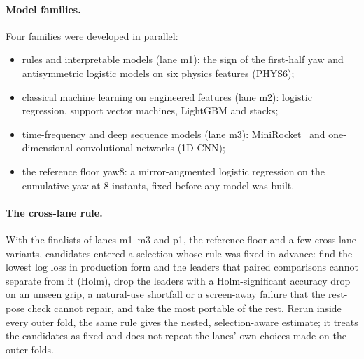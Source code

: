 \paragraph{Model families.} Four families were developed in parallel:
\begin{itemize}[nosep,leftmargin=1.5em]
  \item rules and interpretable models (lane m1): the sign of the first-half yaw and antisymmetric logistic models on
    six physics features (PHYS6);
  \item classical machine learning on  engineered features (lane m2): logistic regression,
    support vector machines, LightGBM and stacks;
  \item time-frequency and deep sequence models (lane m3): MiniRocket~\cite{dempster2021minirocket} and
    one-dimensional convolutional networks (1D CNN);
  \item the reference floor yaw8: a mirror-augmented logistic regression on the cumulative yaw at 8 instants, fixed
    before any model was built.
\end{itemize}

\paragraph{The cross-lane rule.} With the finalists of lanes m1--m3 and p1, the reference floor and a few cross-lane
variants,  candidates entered a selection whose rule was fixed in advance: find the lowest log
loss in production form and the leaders that paired comparisons cannot separate from it (Holm), drop the leaders
with a Holm-significant accuracy drop on an unseen grip, a natural-use shortfall or a screen-away failure that the
rest-pose check cannot repair, and take the most portable of the rest. Rerun inside every outer fold, the same rule gives
the nested, selection-aware estimate; it treats the candidates as fixed and does not repeat the lanes' own choices
made on the outer folds.
